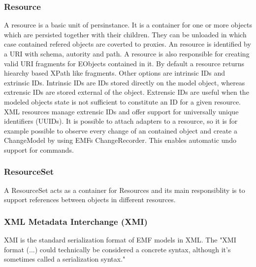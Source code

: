 \subsubsection{Resource}
A resource is a basic unit of persinstance. It is a container for one or more objects which are persisted together with their children. They can be unloaded in which case contained refered objects  are coverted to proxies. An resource is identified by a URI with schema, autority and path. A resource is also responsible for creating valid URI fragments for EObjects contained in it. By default a resource returns hiearchy based XPath like fragments. Other options are intrinsic IDs and extrinsic IDs. Intrinsic IDs are IDs stored directly on the model object, whereas extrensic IDs are stored external of the object. Extrensic IDs are useful when the modeled objects state is not sufficient to constitute an ID for a given resource. XML resources manage extrensic IDs and offer support for universally unique identifiers (UUIDs). It is possible to attach adapters to a resource, so it is for example possible to observe every change of an contained object and create a ChangeModel by using EMFs ChangeRecorder. This enables automatic undo support for commands. \cite{EMF2nd}

\subsubsection{ResourceSet}
A ResourceSet acts as a container for Resources and its main responsiblity is to support references between objects in different resources. 

\subsubsection{XML Metadata Interchange (XMI)}
XMI is the standard serialization format of EMF models in XML. The "XMI format (...) could technically be considered a concrete syntax, although it's sometimes called a serialization syntax." \cite{EMP}

